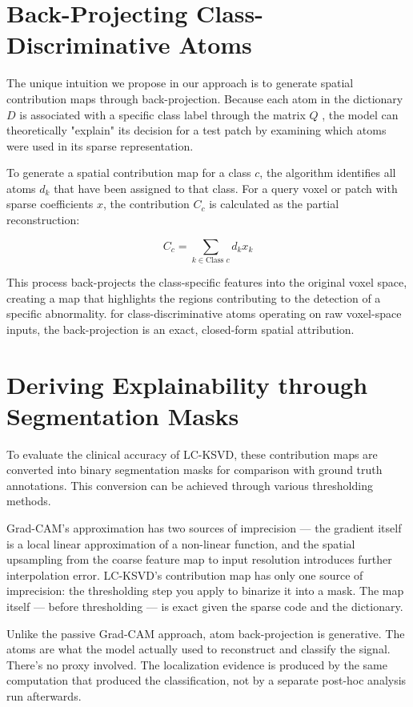 \section{Back-Projecting Class-Discriminative Atoms}
The unique intuition we propose in our approach is to generate spatial contribution maps through back-projection. Because
each atom in the dictionary $D$ is associated with a specific class label through the matrix $Q$ \cite{jiang2013lcksvd}, the model can theoretically
"explain" its decision for a test patch by examining which atoms were used in its sparse representation.

To generate a spatial contribution map for a class $c$, the algorithm identifies all atoms $d_k$ that have been assigned
to that class. For a query voxel or patch with sparse coefficients $x$, the contribution $C_c$ is calculated as the
partial reconstruction:

$$C_c = \sum_{k \in \text{Class } c} d_k x_k$$

This process back-projects the class-specific features into the original voxel space, creating a map
that highlights the regions contributing to the detection of a specific abnormality. for class-discriminative atoms
operating on raw voxel-space inputs, the back-projection is an exact, closed-form spatial attribution.

\section{Deriving Explainability through Segmentation Masks}
To evaluate the clinical accuracy of LC-KSVD, these contribution maps are converted into binary segmentation masks for
comparison with ground truth annotations. This conversion can be achieved through various thresholding methods.

Grad-CAM's approximation has two sources of imprecision — the gradient itself is a local linear approximation of a non-linear
function, and the spatial upsampling from the coarse feature map to input resolution introduces further interpolation error. 
LC-KSVD's contribution map has only one source of imprecision: the thresholding step you apply to binarize it into a mask.
The map itself — before thresholding — is exact given the sparse code and the dictionary.


Unlike the passive Grad-CAM approach, atom back-projection is generative. The atoms are what the model actually used to
reconstruct and classify the signal. There's no proxy involved. The localization evidence is produced by the same
computation that produced the classification, not by a separate post-hoc analysis run afterwards.



